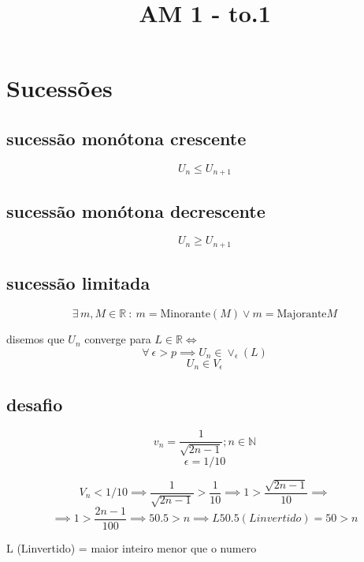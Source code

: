\documentclass[12pt]{article}
\begin{document}
\title{AM 1 - to.1}

\maketitle

\break

\section{Sucessões}

\subsection{sucessão monótona crescente}
$$ U_n\leq U_{n+1} $$
\subsection{sucessão monótona decrescente}
$$ U_n \geq U_{n+1} $$

\subsection{sucessão limitada}
$$ \exists\, m, M \in \mathbb{R}\ :\ m = \text{Minorante}(M) \vee m = \text{Majorante}{M} $$

disemos que $U_n$ converge para $L\in\mathbb{R} \iff$
$$ \forall\ \epsilon>p\implies U_n\in\vee_{\epsilon}(L) $$
$$ U_n\in V_\epsilon $$

\subsection{desafio}
$$ v_n = \frac{1}{\sqrt{2n-1}}; n\in\mathbb{N} $$
$$ \epsilon = 1/10 $$

$$ V_n<1/10\implies \frac{1}{\sqrt{2n-1}}>\frac{1}{10}\implies 1>\frac{\sqrt{2n-1}}{10}\implies $$
$$ \implies 1>\frac{2n-1}{100}\implies 50.5>n\implies L50.5(L invertido) = 50> n $$

L (Linvertido) = maior inteiro menor que o numero
\end{document}
